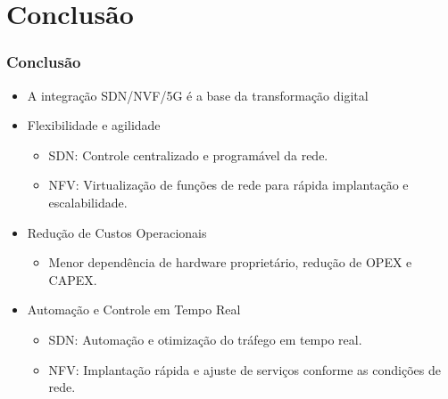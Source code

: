 
\section{Conclusão}
\begin{frame}[allowframebreaks]
    \frametitle{Conclusão}
    \begin{itemize}
        \item A integração SDN/NVF/5G é a base da transformação digital
        \item Flexibilidade e agilidade
        \begin{itemize}
            \item SDN: Controle centralizado e programável da rede.
            \item NFV: Virtualização de funções de rede para rápida implantação e escalabilidade.
        \end{itemize}
        \item Redução de Custos Operacionais
        \begin{itemize}
            \item Menor dependência de hardware proprietário, redução de OPEX e CAPEX.
        \end{itemize}
        \item Automação e Controle em Tempo Real
        \begin{itemize}
            \item SDN: Automação e otimização do tráfego em tempo real.
            \item NFV: Implantação rápida e ajuste de serviços conforme as condições de rede.
        \end{itemize}
    \end{itemize}
\end{frame}